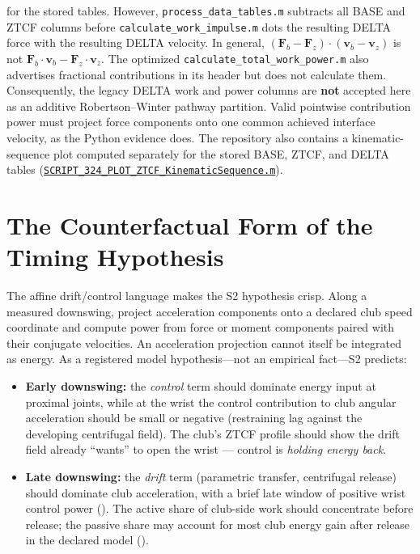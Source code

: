\documentclass[
  letterpaper,
]{report}
\providecommand{\tightlist}{%
  \setlength{\itemsep}{0pt}\setlength{\parskip}{0pt}}
\begin{document}
for the stored tables. However, \texttt{process\_data\_tables.m}
subtracts all BASE and ZTCF columns before
\texttt{calculate\_work\_impulse.m} dots the resulting DELTA force with
the resulting DELTA velocity. In general,
\((\mathbf F_b-\mathbf F_z)\cdot(\mathbf v_b-\mathbf v_z)\) is not
\(\mathbf F_b\cdot\mathbf v_b-\mathbf F_z\cdot\mathbf v_z\). The
optimized \texttt{calculate\_total\_work\_power.m} also advertises
fractional contributions in its header but does not calculate them.
Consequently, the legacy DELTA work and power columns are \textbf{not}
accepted here as an additive Robertson--Winter pathway partition. Valid
pointwise contribution power must project force components onto one
common achieved interface velocity, as the Python evidence does. The
repository also contains a kinematic-sequence plot computed separately
for the stored BASE, ZTCF, and DELTA tables
(\href{https://github.com/D-sorganization/UpstreamDrift/blob/main/src/engines/Simscape_Multibody_Models/2D_Golf_Model/matlab/Scripts/_ZTCF\%20Scripts/SCRIPT_324_PLOT_ZTCF_KinematicSequence.m}{\texttt{SCRIPT\_324\_PLOT\_ZTCF\_KinematicSequence.m}}).

\section{The Counterfactual Form of the Timing
Hypothesis}\label{sec-hypothesis}

The affine drift/control language makes the S2 hypothesis crisp. Along a
measured downswing, project acceleration components onto a declared club
speed coordinate and compute power from force or moment components
paired with their conjugate velocities. An acceleration projection
cannot itself be integrated as energy. As a registered model
hypothesis---not an empirical fact---S2 predicts:

\begin{itemize}
\tightlist
\item
  \textbf{Early downswing:} the \emph{control} term should dominate
  energy input at proximal joints, while at the wrist the control
  contribution to club angular acceleration should be small or negative
  (restraining lag against the developing centrifugal field). The club's
  ZTCF profile should show the drift field already ``wants'' to open the
  wrist --- control is \emph{holding energy back}.
\item
  \textbf{Late downswing:} the \emph{drift} term (parametric transfer,
  centrifugal release) should dominate club acceleration, with a brief
  late window of positive wrist control power
  (). The active
  share of club-side work should concentrate before release; the passive
  share may account for most club energy gain after release in the
  declared model ().
\end{itemize}
\end{document}
